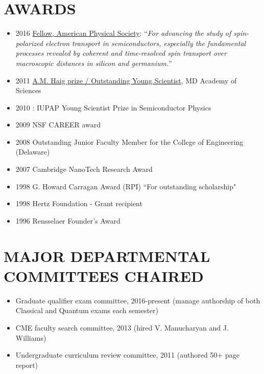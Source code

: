 \documentclass[paper=letter,fontsize=11pt]{scrartcl} %
\newcommand{\NewPart}[2]{\section*{\uppercase{#1} #2}}
\begin{document}
\NewPart{Awards}{}
\begin{itemize}
\item 2016 \href{https://www.aps.org/programs/honors/fellowships/archive-all.cfm?initial=&year=2016&unit_id=DCMP&institution=University+of+Maryland%2C+College+Park}{Fellow, American Physical Society}: “\textit{For advancing the study of spin-polarized electron transport in semiconductors, especially the fundamental processes revealed by coherent and time-resolved spin transport over macroscopic distances in silicon and germanium.}”
\item 2011 \href{http://www.mdsci.org/programs/outstanding-young-scientist-outstanding-young-engineer/past-oys-recipients/}{A.M. Haig prize / Outstanding Young Scientist}, MD Academy of Sciences
\item 2010 :  IUPAP Young Scientist Prize in Semiconductor Physics 
\item 2009 NSF CAREER award
\item 2008 Outstanding Junior Faculty Member for the College of Engineering (Delaware)
\item 2007 Cambridge NanoTech Research Award 
\item 1998 G. Howard Carragan Award (RPI) ``For outstanding scholarship"
\item 1998 Hertz Foundation - Grant recipient
\item 1996 Rensselaer Founder's Award
\end{itemize}

\NewPart{Major Departmental Committees Chaired}{}
\begin{itemize}
\item Graduate qualifier exam committee, 2016-present (manage authorship of both Classical and Quantum exams each semester)
\item CME faculty search committee, 2013 (hired V. Manucharyan and J. Williams)
\item Undergraduate curriculum review committee, 2011 (authored 50+ page report)
\end{itemize}

\end{document}
